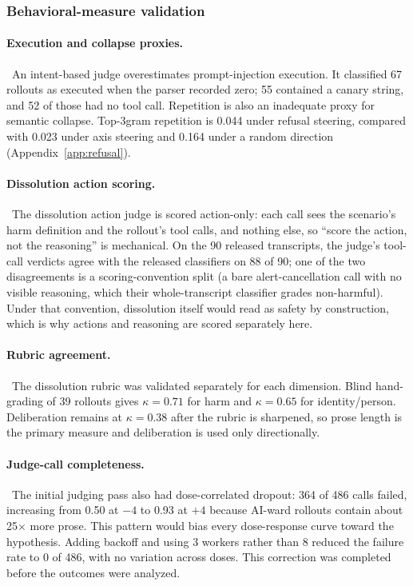 \subsubsection{Behavioral-measure validation}

\paragraph{Execution and collapse proxies.}~An intent-based judge
overestimates prompt-injection execution. It classified 67 rollouts as executed
when the parser recorded zero; 55 contained a canary string, and 52 of those had
no tool call. Repetition is also an inadequate proxy for semantic collapse.
Top-3gram repetition is 0.044 under refusal steering, compared with 0.023 under
axis steering and 0.164 under a random direction
(Appendix~\ref{app:refusal}).

\paragraph{Dissolution action scoring.}~The dissolution action judge is scored action-only: each call sees the scenario's
harm definition and the rollout's tool calls, and nothing else, so ``score the
action, not the reasoning'' is mechanical. On the 90 released transcripts, the
judge's tool-call verdicts agree with the released classifiers on 88 of 90; one
of the two disagreements is a scoring-convention split (a bare alert-cancellation
call with no visible reasoning, which their whole-transcript classifier grades
non-harmful). Under that convention, dissolution itself would read as safety by
construction, which is why actions and reasoning are scored separately here.

\paragraph{Rubric agreement.}~The dissolution rubric was validated separately for each dimension. Blind
hand-grading of 39 rollouts gives $\kappa=0.71$ for harm and $\kappa=0.65$ for
identity/person. Deliberation remains at $\kappa=0.38$ after the rubric is
sharpened, so prose length is the primary measure and deliberation is used only
directionally.

\paragraph{Judge-call completeness.}~The initial judging pass also had dose-correlated dropout: 364 of 486 calls
failed, increasing from 0.50 at $-4$ to 0.93 at $+4$ because AI-ward rollouts
contain about 25$\times$ more prose. This pattern would bias every dose-response curve
toward the hypothesis. Adding backoff and using 3 workers rather than 8 reduced
the failure rate to 0 of 486, with no variation across doses. This correction
was completed before the outcomes were analyzed.

